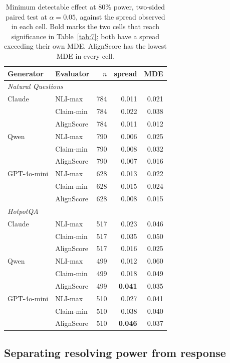 \documentclass[11pt]{article}
\begin{document}
\begin{table}[t]
\centering\small
\begin{tabular}{llrrr}
\toprule
\textbf{Generator} & \textbf{Evaluator} & $n$ & spread & MDE \\
\midrule
\multicolumn{5}{l}{\emph{Natural Questions}} \\
Claude & NLI-max & 784 & 0.011 & 0.021 \\
 & Claim-min & 784 & 0.022 & 0.038 \\
 & AlignScore & 784 & 0.011 & 0.012 \\
Qwen & NLI-max & 790 & 0.006 & 0.025 \\
 & Claim-min & 790 & 0.008 & 0.032 \\
 & AlignScore & 790 & 0.007 & 0.016 \\
GPT-4o-mini & NLI-max & 628 & 0.013 & 0.022 \\
 & Claim-min & 628 & 0.015 & 0.024 \\
 & AlignScore & 628 & 0.008 & 0.015 \\
\midrule
\multicolumn{5}{l}{\emph{HotpotQA}} \\
Claude & NLI-max & 517 & 0.023 & 0.046 \\
 & Claim-min & 517 & 0.035 & 0.050 \\
 & AlignScore & 517 & 0.016 & 0.025 \\
Qwen & NLI-max & 499 & 0.012 & 0.060 \\
 & Claim-min & 499 & 0.018 & 0.049 \\
 & AlignScore & 499 & \textbf{0.041} & 0.035 \\
GPT-4o-mini & NLI-max & 510 & 0.027 & 0.041 \\
 & Claim-min & 510 & 0.038 & 0.040 \\
 & AlignScore & 510 & \textbf{0.046} & 0.037 \\
\bottomrule
\end{tabular}
\caption{Minimum detectable effect at 80\% power, two-sided paired test at $\alpha = 0.05$, against the spread observed in each cell. Bold marks the two cells that reach significance in Table~\ref{tab:7}; both have a spread exceeding their own MDE. AlignScore has the lowest MDE in every cell.}
\label{tab:power}
\end{table}



\subsection{Separating resolving power from response}
\label{app:standardised}
\end{document}
